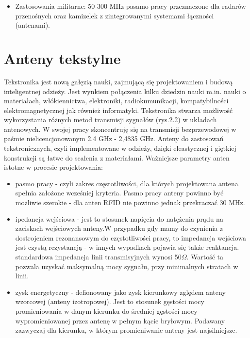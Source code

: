 \begin{itemize}
\begin{itemize}
\begin{itemize}
	\item Zastosowania militarne: 50-300 MHz pasamo pracy przeznaczone dla radarów przenośnych oraz kamizelek z zintegrowanymi systemami łączności (antenami).

\end{itemize}

\section{Anteny tekstylne}

Tekstronika jest nową gałęzią nauki, zajmującą się projektowaniem i budową inteligentnej odzieży. Jest wynkiem połączenia kilku dziedzin nauki m.in. nauki o materiałach, włókiennictwa, elektroniki, radiokumunikacji, kompatybilności elektromagnetycznej jak również informatyki. Tekstronika stwarza możliwość wykorzystania różnych metod transmisji sygnałów (rys.2.2) w układach antenowych. W swojej pracy skoncentruję się na transmisji bezprzewodowej w paśmie nielicencjonowanym 2.4 GHz - 2,4835 GHz.  
Anteny do zastosowań tekstronicznych, czyli implementowane w odzieży, dzięki eleastycznej i giętkiej konstrukcji są łatwe do scalenia z materiałami. 
Ważniejsze parametry anten istotne w procesie projektowania: 

\begin{itemize}\setlength{\itemsep}{0pt}

	\item pasmo pracy - czyli zakres częstotliwości, dla których projektowana antena spełnia założone wcześniej kryteria. Pasmo pracy anteny powinno być możliwie szerokie - dla anten RFID nie powinno jednak przekraczać 30 MHz. 

	\item ipedancja wejściowa - jest to stosunek napięcia do natężenia prądu na zaciskach wejściowych anteny.W przypadku gdy mamy do czynienia z dostrojeniem rezonansowym do częstotliwości pracy, to impedancja wejściowa jest czystą rezystancją - w innych wypadkach pojawia się także reaktancja.
	standardowa impedancja linii transmisyjnych wynosi 50\(\Omega\). Wartość ta pozwala uzyskać maksymalną mocy sygnału, przy minimalnych stratach w linii.

	\item zysk energetyczny - defionowany jako zysk kierunkowy zględem anteny wzorcowej (anteny izotropowej).
	Jest to stosunek gęstości mocy promieniowania w danym kierunku do średniej gęstości mocy wypromieniowanej przez antenę w pełnym kącie bryłowym. Podawany zazwyczaj dla kierunku, w którym promieniwanie anteny jest najsilniejsze.  


\end{itemize}
\end{itemize}
\end{itemize}
